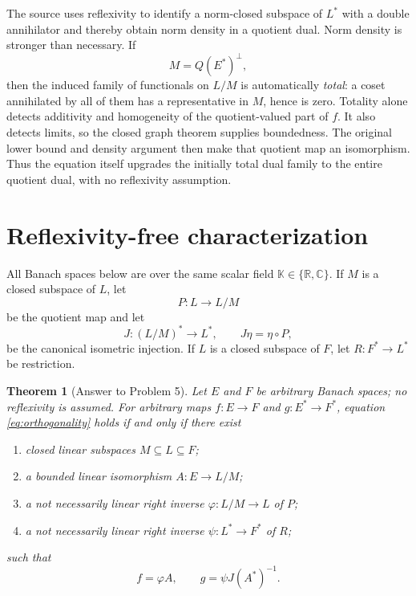 \documentclass[11pt]{article}
\newtheorem{theorem}{Theorem}
\newcommand{\K}{\mathbb K}
\begin{document}
The source uses reflexivity to identify a norm-closed subspace of $L^*$ with a double annihilator and thereby obtain norm density in a quotient dual. Norm density is stronger than necessary. If
\[
  M=Q(E^*)^\perp,
\]
then the induced family of functionals on $L/M$ is automatically \emph{total}: a coset annihilated by all of them has a representative in $M$, hence is zero. Totality alone detects additivity and homogeneity of the quotient-valued part of $f$. It also detects limits, so the closed graph theorem supplies boundedness. The original lower bound and density argument then make that quotient map an isomorphism. Thus the equation itself upgrades the initially total dual family to the entire quotient dual, with no reflexivity assumption.

\section{Reflexivity-free characterization}

All Banach spaces below are over the same scalar field $\K\in\{\mathbb R,\mathbb C\}$. If $M$ is a closed subspace of $L$, let
\[
  P:L\longrightarrow L/M
\]
be the quotient map and let
\[
  J:(L/M)^*\longrightarrow L^*,\qquad J\eta=\eta\circ P,
\]
be the canonical isometric injection. If $L$ is a closed subspace of $F$, let $R:F^*\to L^*$ be restriction.

\begin{theorem}[Answer to Problem 5]\label{thm:main}
Let $E$ and $F$ be arbitrary Banach spaces; no reflexivity is assumed. For arbitrary maps $f:E\to F$ and $g:E^*\to F^*$, equation \eqref{eq:orthogonality} holds if and only if there exist
\begin{enumerate}[label=\textup{(\roman*)}]
  \item closed linear subspaces $M\subseteq L\subseteq F$;
  \item a bounded linear isomorphism $A:E\to L/M$;
  \item a not necessarily linear right inverse $\varphi:L/M\to L$ of $P$;
  \item a not necessarily linear right inverse $\psi:L^*\to F^*$ of $R$;
\end{enumerate}
such that
\begin{equation}\label{eq:decomp}
  f=\varphi A,
  \qquad
  g=\psi J(A^*)^{-1}.
\end{equation}
\end{theorem}
\end{document}

